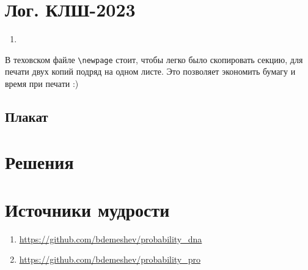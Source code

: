 \documentclass[12pt]{article}
\newcounter{problem}[section]
\theoremstyle{definition}
\begin{document}
\newpage
\dayone
\vfill
\dayone

\newpage
\daytwo
\vfill
\daytwo

\newpage
\daythree
\vfill
\daythree

\newpage



\newpage

\section{Лог. КЛШ-2023}

\begin{enumerate}
  \item 
\end{enumerate}

В теховском файле \verb|\newpage| стоит, чтобы легко было скопировать секцию, для печати двух копий подряд на одном листе.
Это позволяет экономить бумагу и время при печати :)

\subsection{Плакат}






\renewenvironment{solution}[1]{%
         \vskip .5cm plus 2cm minus 0.1cm%
         {\bfseries \hyperlink{problem:#1}{#1.}}%
}%
{%
}%



\section{Решения}



\section{Источники мудрости}


\begin{enumerate}
\item \url{https://github.com/bdemeshev/probability_dna}
\item \url{https://github.com/bdemeshev/probability_pro}
\end{enumerate}

\printbibliography[heading=none]
\end{document}
